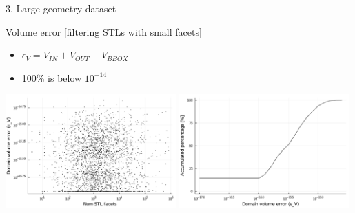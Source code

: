 \documentclass{beamer}
\begin{document}
\begin{frame}{3. Large geometry dataset}

  \begin{block}{Volume error [filtering STLs with small facets]}
  \begin{itemize}
    \item
      $\epsilon_V = V_{IN} + V_{OUT} - V_{BBOX}$
    \item
      100\% is below $10^{-14}$
  \end{itemize}
  \end{block}

  \includegraphics[width=0.49\textwidth]{../analysis/plots/filter_num_stl_facets_volume_error}
  \includegraphics[width=0.49\textwidth]{../analysis/plots/filter_histogram_volume_error}
\end{frame}
\end{document}
